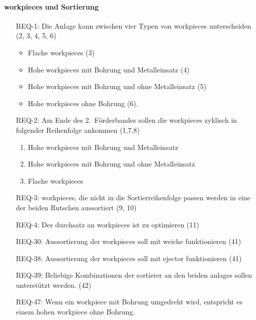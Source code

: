 \paragraph{\glspl{workpiece} und Sortierung}
\begin{itemize}
    \item[REQ-1:] Die Anlage kann zwischen vier Typen von \glspl{workpiece} unterscheiden (2, 3, 4, 5, 6)
    \begin{itemize}
        \item Flache \glspl{workpiece} (3)
        \item Hohe \glspl{workpiece} mit Bohrung und Metalleinsatz (4)
        \item Hohe \glspl{workpiece} mit Bohrung und ohne Metalleinsatz (5)
        \item Hohe \glspl{workpiece} ohne Bohrung (6).
    \end{itemize}
    \item[REQ-2:] Am Ende des 2.\ Förderbandes sollen die \glspl{workpiece} zyklisch in folgender Reihenfolge ankommen (1,7,8)
    \begin{enumerate}
        \item Hohe \glspl{workpiece} mit Bohrung und Metalleinsatz
        \item Hohe \glspl{workpiece} mit Bohrung und ohne Metalleinsatz
        \item Flache \glspl{workpiece}
    \end{enumerate}
    \item[REQ-3:] \glspl{workpiece}, die nicht in die Sortierreihenfolge passen werden in eine der beiden Rutschen aussortiert (9, 10)
    \item[REQ-4:] Der \gls{durchsatz} an \glspl{workpiece} ist zu optimieren (11)
    \item[REQ-30:] Aussortierung der \glspl{workpiece} soll mit \gls{weiche} funktionieren (41)
    \item[REQ-38:] Aussortierung der \glspl{workpiece} soll mit \gls{ejector} funktionieren (41)
    \item[REQ-39:] Beliebige Kombinationen der \gls{sortierer} an den beiden \glspl{anlage} sollen unterstützt werden. (42)
    \item[REQ-47:] Wenn ein \gls{workpiece} mit Bohrung umgedreht wird, entspricht es einem hohen \gls{workpiece} ohne Bohrung.
\end{itemize}


